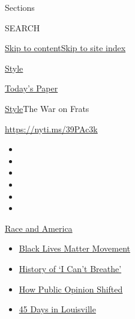 Sections

SEARCH

\protect\hyperlink{site-content}{Skip to
content}\protect\hyperlink{site-index}{Skip to site index}

\href{https://www.nytimes.com/section/style}{Style}

\href{https://myaccount.nytimes.com/auth/login?response_type=cookie\&client_id=vi}{}

\href{https://www.nytimes.com/section/todayspaper}{Today's Paper}

\href{/section/style}{Style}\textbar{}The War on Frats

\url{https://nyti.ms/39PAc3k}

\begin{itemize}
\item
\item
\item
\item
\item
\item
\end{itemize}

\href{https://www.nytimes.com/news-event/george-floyd-protests-minneapolis-new-york-los-angeles?action=click\&pgtype=Article\&state=default\&region=TOP_BANNER\&context=storylines_menu}{Race
and America}

\begin{itemize}
\tightlist
\item
  \href{https://www.nytimes.com/interactive/2020/07/03/us/george-floyd-protests-crowd-size.html?action=click\&pgtype=Article\&state=default\&region=TOP_BANNER\&context=storylines_menu}{Black
  Lives Matter Movement}
\item
  \href{https://www.nytimes.com/interactive/2020/06/28/us/i-cant-breathe-police-arrest.html?action=click\&pgtype=Article\&state=default\&region=TOP_BANNER\&context=storylines_menu}{History
  of `I Can't Breathe'}
\item
  \href{https://www.nytimes.com/interactive/2020/06/10/upshot/black-lives-matter-attitudes.html?action=click\&pgtype=Article\&state=default\&region=TOP_BANNER\&context=storylines_menu}{How
  Public Opinion Shifted}
\item
  \href{https://www.nytimes.com/interactive/2020/07/16/us/black-lives-matter-protests-louisville-breonna-taylor.html?action=click\&pgtype=Article\&state=default\&region=TOP_BANNER\&context=storylines_menu}{45
  Days in Louisville}
\end{itemize}

